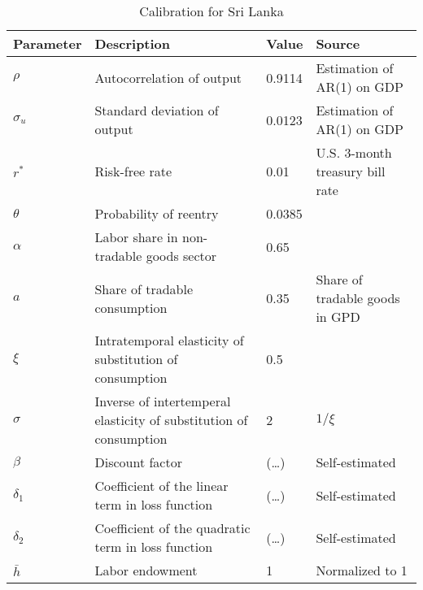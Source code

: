 \begin{table}[h]
    \centering
    \begin{tabular}{@{}llll@{}}
        \toprule
    Parameter  & Description                                                       & Value  & Source                                                                         \\ \midrule
    $\rho$     & Autocorrelation of output                                         & 0.9114  & Estimation of AR(1) on GDP\\
    $\sigma_u$ & Standard deviation of output                                      & 0.0123 & Estimation of AR(1) on GDP \\
    $r^*$      & Risk-free rate                                                    & 0.01 & U.S. 3-month treasury bill rate \\
    $\theta$   & Probability of reentry                                            & 0.0385 & \citet*{Chatterjee-12}                                              \\
    $\alpha$   & Labor share in non-tradable goods sector                          & 0.65   & \citet{Jegajeevan-Sri-Lanka-DSGE}                                                       \\
    $a$        & Share of tradable consumption                                     & 0.35   & Share of tradable goods in GPD                  \\
    $\xi$      & Intratemporal elasticity of substitution of consumption & 0.5   & \citet{Na-18}                             \\
    $\sigma$   & Inverse of intertemperal elasticity of substitution of consumption  & 2   & $1 / \xi$                                                                      \\
    $\beta$    & Discount factor                                                   & (\dots)  &  Self-estimated                                                                              \\
    $\delta_1$ & Coefficient of the linear term in loss function                   &  (\dots) &   Self-estimated                                                                             \\
    $\delta_2$ & Coefficient of the quadratic term in loss function                &  (\dots)   &               Self-estimated                                                                 \\
    $\bar{h}$  & Labor endowment                                                   & 1      & Normalized to 1\\
    \bottomrule
    \end{tabular}%
    \caption{Calibration for Sri Lanka}
    \label{tab:cal-sri-lanka}
    \end{table}